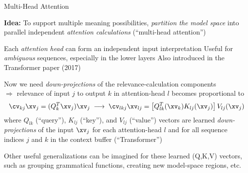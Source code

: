 




\begin{slide}[\slideopts]{Multi-Head Attention}

\textbf{Idea:} To support multiple meaning possibilities, \emph{partition the model space} into\\
parallel independent \emph{attention calculations} (``multi-head attention'')


\begin{itemize}
  \mpitem Each \emph{attention head} can form an independent input interpretation
  \mpitem Useful for \emph{ambiguous} sequences, especially in the lower layers
  \mpitem Also introduced in the Transformer paper (2017)
\end{itemize}

\maybepause

Now we need \emph{down-projections} of the relevance-calculation components\\
$\Rightarrow$ relevance of input $j$ to output $k$ in attention-head $l$ becomes proportional to
\[
\cv_{kj}\xv_j = (Q_k^T \xv_j)\xv_j \;\longrightarrow\; \cv_{lkj}\xv_{lj} = \left[Q_{lk}^T(\xv_k) K_{lj}(\xv_{j})\right]V_{lj}(\xv_j)
\]
where $Q_{lk}$ (``query''), $K_{lj}$ (``key''), and $V_{lj}$
(``value'') vectors are learned \emph{down-projections} of the input $\xv_j$
for each attention-head $l$ and for all sequence indices $j$ and $k$
in the context buffer (``Transformer'')


\maybepause

Other useful generalizations can be imagined for these learned (Q,K,V)
vectors, such as grouping grammatical functions, creating new
model-space regions, etc.

\end{slide}

